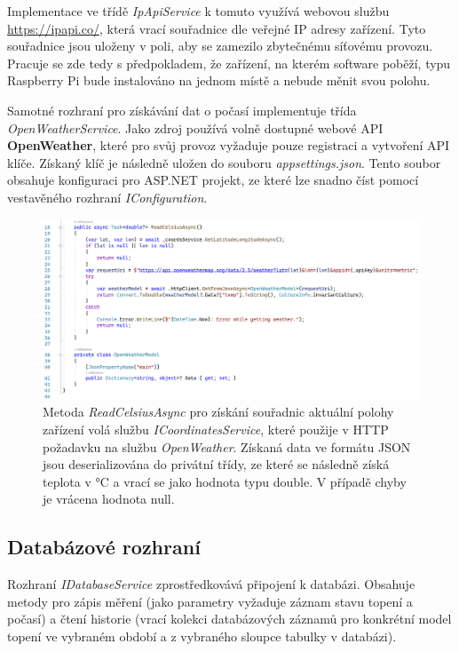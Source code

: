 Implementace ve třídě {\it IpApiService} k tomuto využívá webovou službu \url{https://ipapi.co/}, která vrací souřadnice dle veřejné IP adresy zařízení. Tyto souřadnice jsou uloženy v poli, aby se zamezilo zbytečnému síťovému provozu. Pracuje se zde tedy s předpokladem, že zařízení, na kterém software poběží, typu Raspberry Pi bude instalováno na jednom místě a nebude měnit svou polohu.

Samotné rozhraní pro získávání dat o počasí implementuje třída {\it OpenWeatherService}. Jako zdroj používá volně dostupné webové API \textbf{OpenWeather}, které pro svůj provoz vyžaduje pouze registraci a vytvoření API klíče. Získaný klíč je následně uložen do souboru {\it appsettings.json}. Tento soubor obsahuje konfiguraci pro ASP.NET projekt, ze které lze snadno číst pomocí vestavěného rozhraní {\it IConfiguration}.

\begin{figure}[hbt]
\includegraphics[width=1.05\textwidth]{obrazky-figures/code-openweather-read.png}
\caption{Metoda {\it ReadCelsiusAsync} pro získání souřadnic aktuální polohy zařízení volá službu {\it ICoordinatesService}, které použije v HTTP požadavku na službu {\it OpenWeather}. Získaná data ve formátu JSON jsou deserializována do privátní třídy, ze které se následně získá teplota v °C a vrací se jako hodnota typu double. V případě chyby je vrácena hodnota null.}
\end{figure}

\pagebreak

\subsection{Databázové rozhraní}
Rozhraní {\it IDatabaseService} zprostředkovává připojení k databázi. Obsahuje metody pro zápis měření (jako parametry vyžaduje záznam stavu topení a počasí) a čtení historie (vrací kolekci databázových záznamů pro konkrétní model topení ve vybraném období a z vybraného sloupce tabulky v databázi).

